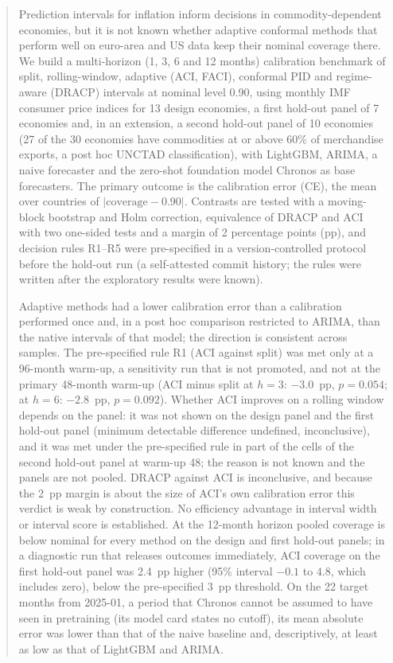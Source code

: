 \begin{abstract}
\noindent
Prediction intervals for inflation inform decisions in commodity-dependent economies, but it is not known whether adaptive conformal methods that perform well on euro-area and US data keep their nominal coverage there. We build a multi-horizon (1, 3, 6 and 12 months) calibration benchmark of split, rolling-window, adaptive (ACI, FACI), conformal PID and regime-aware (DRACP) intervals at nominal level 0.90, using monthly IMF consumer price indices for 13 design economies, a first hold-out panel of 7 economies and, in an extension, a second hold-out panel of 10 economies (27 of the 30 economies have commodities at or above 60\% of merchandise exports, a post hoc UNCTAD classification), with LightGBM, ARIMA, a naive forecaster and the zero-shot foundation model Chronos as base forecasters. The primary outcome is the calibration error (CE), the mean over countries of $|\text{coverage}-0.90|$. Contrasts are tested with a moving-block bootstrap and Holm correction, equivalence of DRACP and ACI with two one-sided tests and a margin of 2 percentage points (pp), and decision rules R1--R5 were pre-specified in a version-controlled protocol before the hold-out run (a self-attested commit history; the rules were written after the exploratory results were known).

Adaptive methods had a lower calibration error than a calibration performed once and, in a post hoc comparison restricted to ARIMA, than the native intervals of that model; the direction is consistent across samples. The pre-specified rule R1 (ACI against split) was met only at a 96-month warm-up, a sensitivity run that is not promoted, and not at the primary 48-month warm-up (ACI minus split at $h=3$: $-3.0$~pp, $p=0.054$; at $h=6$: $-2.8$~pp, $p=0.092$). Whether ACI improves on a rolling window depends on the panel: it was not shown on the design panel and the first hold-out panel (minimum detectable difference undefined, inconclusive), and it was met under the pre-specified rule in part of the cells of the second hold-out panel at warm-up 48; the reason is not known and the panels are not pooled. DRACP against ACI is inconclusive, and because the 2~pp margin is about the size of ACI's own calibration error this verdict is weak by construction. No efficiency advantage in interval width or interval score is established. At the 12-month horizon pooled coverage is below nominal for every method on the design and first hold-out panels; in a diagnostic run that releases outcomes immediately, ACI coverage on the first hold-out panel was 2.4~pp higher (95\% interval $-0.1$ to $4.8$, which includes zero), below the pre-specified 3~pp threshold. On the 22 target months from 2025-01, a period that Chronos cannot be assumed to have seen in pretraining (its model card states no cutoff), its mean absolute error was lower than that of the naive baseline and, descriptively, at least as low as that of LightGBM and ARIMA. \ExplainerStatus{}
\end{abstract}
